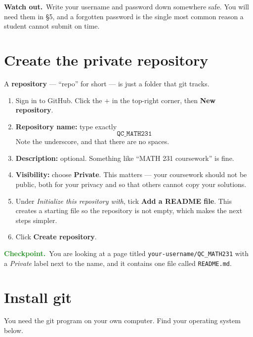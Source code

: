 \documentclass[11pt]{article}
\newcommand{\checkpoint}[1]{\par\smallskip\noindent
  {\small\sffamily\textcolor{ForestGreen}{\textbf{Checkpoint.}}\ #1}\par\smallskip}
\newcommand{\heads}[1]{\par\smallskip\noindent
  {\small\sffamily\textcolor{BrickRed}{\textbf{Watch out.}}\ #1}\par\smallskip}
\newcommand{\repname}{QC\_MATH231}
\begin{document}
\heads{Write your username and password down somewhere safe. You will need them
in \S5, and a forgotten password is the single most common reason a student
cannot submit on time.}

\section{Create the private repository}
A \textbf{repository} --- ``repo'' for short --- is just a folder that git
tracks.

\begin{enumerate}[leftmargin=2.0em,itemsep=5pt]
  \item Sign in to GitHub. Click the \textbf{$+$} in the top-right corner, then
        \textbf{New repository}.
  \item \textbf{Repository name:} type exactly
        \[
          \texttt{\repname}
        \]
        Note the underscore, and that there are no spaces.
  \item \textbf{Description:} optional. Something like ``MATH 231 coursework''
        is fine.
  \item \textbf{Visibility:} choose \textbf{Private}. This matters --- your
        coursework should not be public, both for your privacy and so that
        others cannot copy your solutions.
  \item Under \emph{Initialize this repository with}, tick
        \textbf{Add a README file}. This creates a starting file so the
        repository is not empty, which makes the next steps simpler.
  \item Click \textbf{Create repository}.
\end{enumerate}

\checkpoint{You are looking at a page titled
\texttt{your-username/\repname} with a \emph{Private} label next to the
name, and it contains one file called \texttt{README.md}.}

\section{Install git}
You need the git program on your own computer. Find your operating system below.
\end{document}
